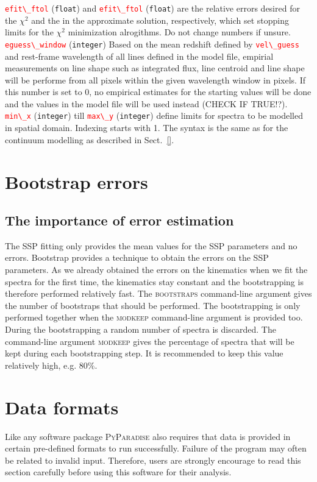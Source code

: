 \documentclass[usenatbib,usegraphicx,useAMS,onecolumn]{mn2e}
\newcommand{\codeline}[1]{\lstinline|#1|}
\newcommand{\paramdef}[1]{\textcolor{red}{\codeline{#1}}}
\begin{document}
\paramdef{efit\_ftol} (\texttt{float}) and \paramdef{efit\_ftol} (\texttt{float}) are the relative errors desired for the $\chi^2$ and the in the approximate solution, respectively, which set stopping limits for the $\chi^2$ minimization alrogithms. Do not change numbers if unsure.\\
\paramdef{eguess\_window} (\texttt{integer}) Based on the mean redshift defined by \paramdef{vel\_guess} and rest-frame wavelength of all lines defined in the model file, empirial measurements on line shape such as integrated flux, line centroid and line shape will be performe from all pixels within the given wavelength window in pixels. If this number is set to 0, no empirical estimates for the starting values will be done and the values in the model file will be used instead (CHECK IF TRUE!?).\\
\paramdef{min\_x} (\texttt{integer})  till \paramdef{max\_y} (\texttt{integer}) define limits for spectra to be modelled in spatial domain. Indexing starts with 1. The syntax is the same as for the continuum modelling as described in Sect.~\ref{}.\\

\section{Bootstrap errors}
\label{sec:bootstrap}
\subsection{The importance of error estimation}
\label{subsec:bootstrap_info}
The SSP fitting only provides the mean values for the SSP parameters and no errors.
Bootstrap provides a technique to obtain the errors on the SSP parameters.
As we already obtained the errors on the kinematics when we fit the spectra for the first time, the kinematics stay constant and the bootstrapping is therefore performed relatively fast.
The \textsc{bootstraps} command-line argument gives the number of bootstraps that should be performed.
The bootstrapping is only performed together when the \textsc{modkeep} command-line argument is provided too.
During the bootstrapping a random number of spectra is discarded.
The command-line argument \textsc{modkeep} gives the percentage of spectra that will be kept during each bootstrapping step.
It is recommended to keep this value relatively high, e.g. 80$\%$.

\section{Data formats}
\label{sec:data}
Like any software package \textsc{PyParadise} also requires that data is provided in certain pre-defined formats to run successfully.
Failure of the program may often be related to invalid input. 
Therefore, users are strongly encourage to read this section carefully before using this software for their analysis. 
\end{document}
